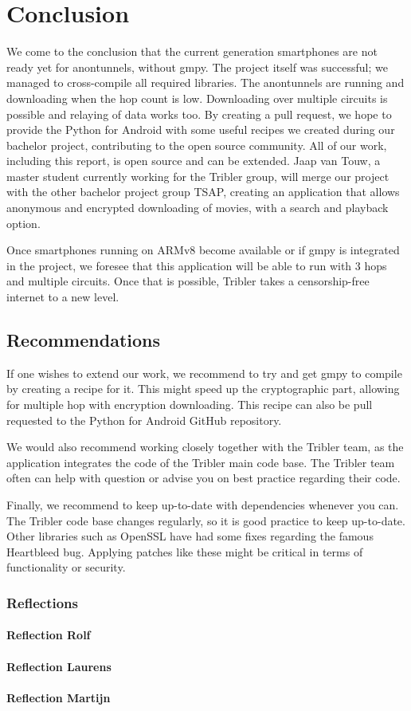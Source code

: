 \chapter{Conclusion}
	We come to the conclusion that the current generation smartphones are not ready yet for anontunnels, without gmpy. The project itself was successful; we managed to cross-compile all required libraries. The anontunnels are running and downloading when the hop count is low. Downloading over multiple circuits is possible and relaying of data works too. By creating a pull request, we hope to provide the Python for Android with some useful recipes we created during our bachelor project, contributing to the open source community. 
	All of our work, including this report, is open source and can be extended. Jaap van Touw, a master student currently working for the Tribler group, will merge our project with the other bachelor project group TSAP, creating an application that allows anonymous and encrypted downloading of movies, with a search and playback option.
	
	
	Once smartphones running on ARMv8 become available or if gmpy is integrated in the project, we foresee that this application will be able to run with 3 hops and multiple circuits. Once that is possible, Tribler takes a censorship-free internet to a new level.
	
	\section{Recommendations}
		If one wishes to extend our work, we recommend to try and get gmpy to compile by creating a recipe for it. This might speed up the cryptographic part, allowing for multiple hop with encryption downloading. This recipe can also be pull requested to the Python for Android GitHub repository.
		
		We would also recommend working closely together with the Tribler team, as the application integrates the code of the Tribler main code base. The Tribler team often can help with question or advise you on best practice regarding their code.
		
		Finally, we recommend to keep up-to-date with dependencies whenever you can. The Tribler code base changes regularly, so it is good practice to keep up-to-date. Other libraries such as OpenSSL have had some fixes regarding the famous Heartbleed bug. Applying patches like these might be critical in terms of functionality or security.
		
	\subsection{Reflections}
	
		\subsubsection{Reflection Rolf}
		
		\subsubsection{Reflection Laurens}
		
		\subsubsection{Reflection Martijn}
			